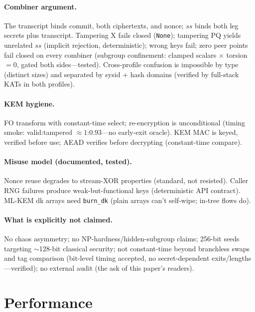\documentclass[11pt,a4paper]{article}
\begin{document}
\paragraph{Combiner argument.}
The transcript binds commit, both ciphertexts, and nonce; $\mathit{ss}$ binds both
leg secrets plus transcript. Tampering X fails closed (\texttt{None}); tampering PQ
yields unrelated $\mathit{ss}$ (implicit rejection, deterministic); wrong keys fail;
zero peer points fail closed on every combiner (subgroup confinement: clamped scalars
$\times$ torsion $= 0$, gated both sides---tested). Cross-profile confusion is
impossible by type (distinct sizes) and separated by sysid + hash domains (verified
by full-stack KATs in both profiles).

\paragraph{KEM hygiene.}
FO transform with constant-time select; re-encryption is unconditional (timing smoke:
valid:tampered $\approx 1$:$0.93$---no early-exit oracle). KEM MAC is keyed, verified
before use; AEAD verifies before decrypting (constant-time compare).

\paragraph{Misuse model (documented, tested).}
Nonce reuse degrades to stream-XOR properties (standard, not resisted). Caller RNG
failures produce weak-but-functional keys (deterministic API contract). ML-KEM dk
arrays need \texttt{burn\_dk} (plain arrays can't self-wipe; in-tree flows do).

\paragraph{What is explicitly not claimed.}
No chaos asymmetry; no NP-hardness/hidden-subgroup claims; 256-bit seeds targeting
$\sim$128-bit classical security; not constant-time beyond branchless swaps and tag
comparison (bit-level timing accepted, no secret-dependent exits/lengths---verified);
no external audit (the ask of this paper's readers).

\section{Performance}
\end{document}
